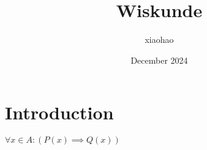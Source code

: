 \documentclass{article}
\title{Wiskunde}
\author{xiaohao }
\date{December 2024}
\begin{document}
\maketitle

\section{Introduction}

\begin{math}
    \forall x \in A: (P(x) {\implies} Q(x))
\end{math}
\end{document}
